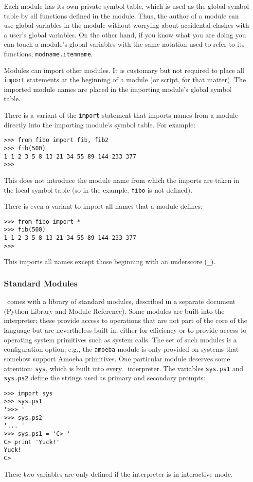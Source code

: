 Each module has its own private symbol table, which is used as the
global symbol table by all functions defined in the module.
Thus, the author of a module can use global variables in the module
without worrying about accidental clashes with a user's global
variables.
On the other hand, if you know what you are doing you can touch a
module's global variables with the same notation used to refer to its
functions,
{\tt modname.itemname}.

Modules can import other modules.
It is customary but not required to place all
{\tt import}
statements at the beginning of a module (or script, for that matter).
The imported module names are placed in the importing module's global
symbol table.

There is a variant of the
{\tt import}
statement that imports names from a module directly into the importing
module's symbol table.
For example:
\begin{code}\begin{verbatim}
>>> from fibo import fib, fib2
>>> fib(500)
1 1 2 3 5 8 13 21 34 55 89 144 233 377
>>> 
\end{verbatim}\end{code}
This does not introduce the module name from which the imports are taken
in the local symbol table (so in the example, {\tt fibo} is not
defined).

There is even a variant to import all names that a module defines:
\begin{code}\begin{verbatim}
>>> from fibo import *
>>> fib(500)
1 1 2 3 5 8 13 21 34 55 89 144 233 377
>>> 
\end{verbatim}\end{code}
This imports all names except those beginning with an underscore
({\tt \_}).

\subsubsection{Standard Modules}

\Python\ comes with a library of standard modules, described in a separate
document (Python Library and Module Reference).
Some modules are built into the interpreter; these provide access to
operations that are not part of the core of the language but are
nevertheless built in, either for efficiency or to provide access to
operating system primitives such as system calls.
The set of such modules is a configuration option; e.g., the
{\tt amoeba}
module is only provided on systems that somehow support Amoeba
primitives.
One particular module deserves some attention:
{\tt sys},
which is built into every \Python\ interpreter.
The variables
{\tt sys.ps1}
and
{\tt sys.ps2}
define the strings used as primary and secondary prompts:
\begin{code}\begin{verbatim}
>>> import sys
>>> sys.ps1
'>>> '
>>> sys.ps2
'... '
>>> sys.ps1 = 'C> '
C> print 'Yuck!'
Yuck!
C> 
\end{verbatim}\end{code}
These two variables are only defined if the interpreter is in
interactive mode.

